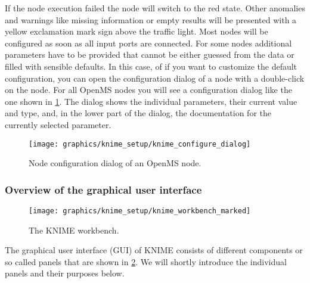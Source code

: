 If the node execution failed the node will switch to the red state. Other anomalies and warnings like missing information or empty results 
will be presented with a yellow exclamation mark sign above the traffic light.
Most nodes will be configured as soon as all input ports are connected.
For some nodes additional parameters have to be provided that cannot be either guessed from the data or filled with sensible defaults.
In this case, of if you want to customize the default configuration, you can open the configuration dialog of a node with a double-click on the node.
For all OpenMS nodes you will see a configuration dialog like the one shown in \cref{fig:knime_configure}.
The dialog shows the individual parameters, their current value and type, and, in the lower part of the dialog, the documentation for the currently selected parameter.

\begin{figure}
\centering
\texttt{[image: graphics/knime\_setup/knime\_configure\_dialog]}
\caption{Node configuration dialog of an OpenMS node.}
\label{fig:knime_configure}
\end{figure}

\subsubsection{Overview of the graphical user interface}

\begin{figure}
\texttt{[image: graphics/knime\_setup/knime\_workbench\_marked]}
\caption{The KNIME workbench.}
\label{fig:knime_workbench}
\end{figure}

The graphical user interface (GUI) of KNIME consists of different components or so called panels that are shown in \cref{fig:knime_workbench}.
We will shortly introduce the individual panels and their purposes below.

